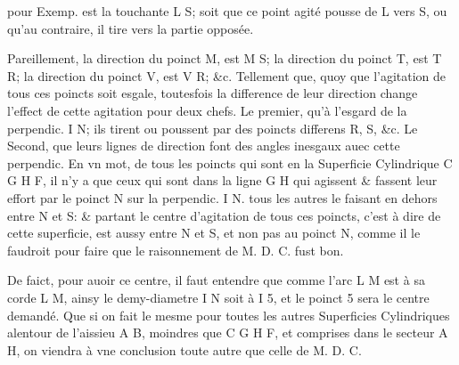 \documentclass[11pt,a4paper]{article}
\begin{document}


pour Exemp. est la touchante L S; soit que ce point agité pousse de L vers S, ou qu'au contraire, il tire vers la partie opposée.

Pareillement, la direction du poinct M, est M S; la direction du poinct T, est T R; la direction du poinct V, est V R; \&c. Tellement que, quoy que l'agitation de tous ces poincts soit esgale, toutesfois la difference de leur direction change l'effect de cette agitation pour deux chefs. Le premier, qu'à l'esgard de la perpendic. I N; ils tirent ou poussent par des poincts differens R, S, \&c. Le Second, que leurs lignes de direction font des angles inesgaux auec cette perpendic. En vn mot, de tous les poincts qui sont en la Superficie Cylindrique C G H F, il n'y a que ceux qui sont dans la ligne G H qui agissent \& fassent leur effort par le poinct N sur la perpendic. I N. tous les autres le faisant en dehors entre N et S: \& partant le centre d'agitation de tous ces poincts, c'est à dire de cette superficie, est aussy entre N et S, et non pas au poinct N, comme il le faudroit pour faire que le raisonnement de M. D. C. fust bon.

De faict, pour auoir ce centre, il faut entendre que comme l'arc L M est à sa corde L M, ainsy le demy-diametre I N soit à I 5, et le poinct 5 sera le centre demandé. Que si on fait le mesme pour toutes les autres Superficies Cylindriques alentour de l'aissieu A B, moindres que C G H F, et comprises dans le secteur A H, on viendra à vne conclusion toute autre que celle de M. D. C.
\end{document}
